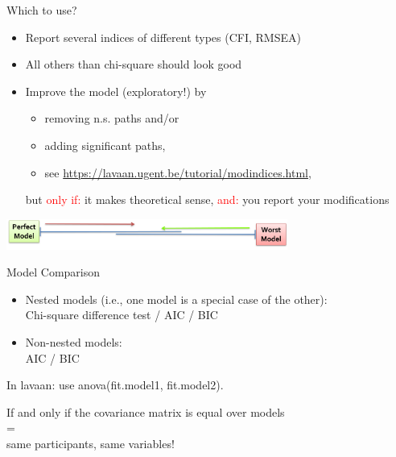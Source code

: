 \documentclass[10pt]{beamer}\usepackage[]{graphicx}\usepackage[]{xcolor}
\begin{document}
\begin{frame}{Which to use?}
\begin{itemize}
  \item{Report several indices of different types (CFI, RMSEA)}
  \item{All others than chi-square should look good}
  \item{Improve the model (exploratory!) by 
    \begin{itemize}
      \item{removing n.s. paths and/or}
      \item{adding significant paths,}
      \item{see \url{https://lavaan.ugent.be/tutorial/modindices.html},}
    \end{itemize}
  but \textcolor{red}{only if:} it makes theoretical sense, \textcolor{red}{and:} you report your modifications
  }
\end{itemize}

\vspace*{3mm}
\includegraphics[height=1cm,keepaspectratio=T] {modelfit.png}

\end{frame}
%
\begin{frame}{Model Comparison}

\begin{itemize}
  \item{Nested models (i.e., one model is a special case of the other): \\ Chi-square difference test / AIC / BIC}
  \item{Non-nested models: \\ AIC / BIC}
\end{itemize}

\vspace*{3mm}

In lavaan: use anova(fit.model1, fit.model2).

\vspace*{3mm}

If and only if the covariance matrix is equal over models \\
= \\
same participants, same variables!

\end{frame}
\end{document}
